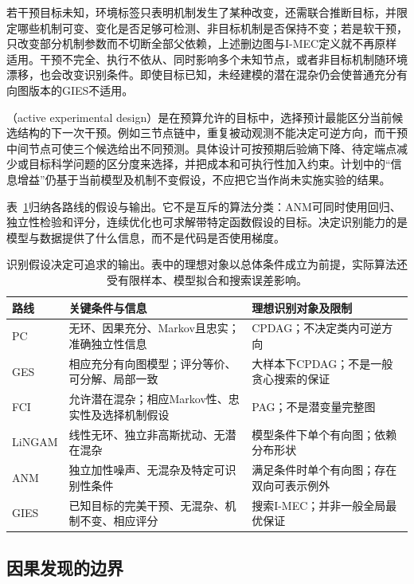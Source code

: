 若干预目标未知，环境标签只表明机制发生了某种改变，还需联合推断目标，并限定哪些机制可变、变化是否足够可检测、非目标机制是否保持不变；若是软干预，只改变部分机制参数而不切断全部父依赖，上述删边图与I-MEC定义就不再原样适用。干预不完全、执行不依从、同时影响多个未知节点，或者非目标机制随环境漂移，也会改变识别条件。即使目标已知，未经建模的潜在混杂仍会使普通充分有向图版本的GIES不适用。

（active experimental design）是在预算允许的目标中，选择预计最能区分当前候选结构的下一次干预。例如三节点链中，重复被动观测不能决定可逆方向，而干预中间节点可使三个候选给出不同预测。具体设计可按预期后验熵下降、待定端点减少或目标科学问题的区分度来选择，并把成本和可执行性加入约束。计划中的“信息增益”仍基于当前模型及机制不变假设，不应把它当作尚未实施实验的结果。

表~\ref{tab:pgm-structure-learning-causal-routes}归纳各路线的假设与输出。它不是互斥的算法分类：ANM可同时使用回归、独立性检验和评分，连续优化也可求解带特定函数假设的目标。决定识别能力的是模型与数据提供了什么信息，而不是代码是否使用梯度。

\begin{table}[htbp]
  \centering
  \small
  \begin{tabularx}{\linewidth}{@{}lXX@{}}
    \toprule
    路线 & 关键条件与信息 & 理想识别对象及限制 \\
    \midrule
    PC & 无环、因果充分、Markov且忠实；准确独立性信息 & CPDAG；不决定类内可逆方向 \\
    GES & 相应充分有向图模型；评分等价、可分解、局部一致 & 大样本下CPDAG；不是一般贪心搜索的保证 \\
    FCI & 允许潜在混杂；相应Markov性、忠实性及选择机制假设 & PAG；不是潜变量完整图 \\
    LiNGAM & 线性无环、独立非高斯扰动、无潜在混杂 & 模型条件下单个有向图；依赖分布形状 \\
    ANM & 独立加性噪声、无混杂及特定可识别性条件 & 满足条件时单个有向图；存在双向可表示例外 \\
    GIES & 已知目标的完美干预、无混杂、机制不变、相应评分 & 搜索I-MEC；并非一般全局最优保证 \\
    \bottomrule
  \end{tabularx}
  \caption{识别假设决定可追求的输出。表中的理想对象以总体条件成立为前提，实际算法还受有限样本、模型拟合和搜索误差影响。}
  \label{tab:pgm-structure-learning-causal-routes}
\end{table}

\subsection{因果发现的边界}
\label{sec:pgm-structure-learning-causal-limits}


